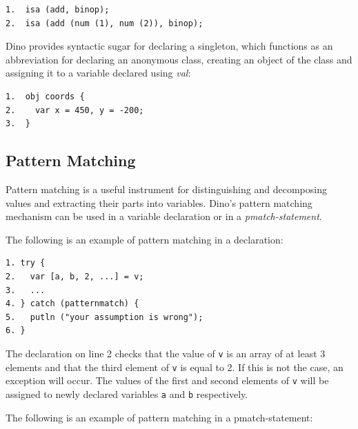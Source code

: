 \documentclass[preprint]{sigplanconf}
\begin{document}
{\footnotesize
\begin{verbatim}
1.  isa (add, binop);
2.  isa (add (num (1), num (2)), binop);
\end{verbatim}
}

Dino provides syntactic sugar for declaring a singleton, which functions as
an abbreviation for declaring an anonymous class, creating an object of the class
and assigning it to a variable declared using \emph{val}:

{\footnotesize
\begin{verbatim}
1.  obj coords {
2.    var x = 450, y = -200;
3.  }
\end{verbatim}
}

\subsection{Pattern Matching}

Pattern matching is a useful instrument for distinguishing and decomposing
values and extracting their parts into variables.
Dino's pattern matching mechanism can
be used in a variable declaration or in a \emph{pmatch-statement}.

The following is an example of pattern matching in a declaration:

{\footnotesize
\begin{verbatim}
1. try {
2.   var [a, b, 2, ...] = v;
3.   ...
4. } catch (patternmatch) {
5.   putln ("your assumption is wrong");
6. }
\end{verbatim}
}

The declaration on line 2 checks that the value of {\tt v} is an array of at
least 3 elements and that the third element of {\tt v} is equal to 2.  If this
is not the case, an exception will occur.
The values of the first and second elements of {\tt v} will be assigned to newly declared variables {\tt a} and {\tt b} respectively.

The following is an example of pattern matching in a pmatch-statement:
\end{document}
